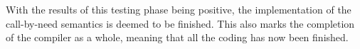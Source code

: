 With the results of this testing phase being positive, the implementation of the
call-by-need semantics is deemed to be finished. This also marks the
completion of the compiler as a whole, meaning that all the coding has now been
finished.







